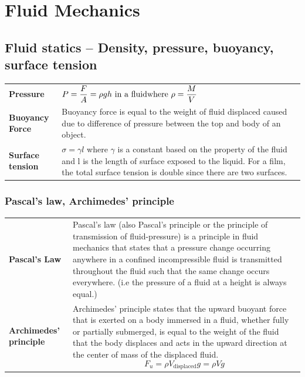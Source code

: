\documentclass[11pt]{article}
\numberwithin{equation}{section}
\begin{document}
	\section{Fluid Mechanics}
		\subsection{Fluid statics {\small \normalfont -- Density, pressure, buoyancy, surface tension}}
			\begin{center}
				\renewcommand{\arraystretch}{2}
				\begin{tabular}[h]{@{}l@{\hspace{2em}}p{10cm}@{}}
					\toprule
					\textbf{Pressure} & $\displaystyle P=\frac{F}{A} = \rho g h \text{~in a fluid} \hfill \text{where~} \rho=\frac{M}{V} \hfill$\\[0.7em]
					\textbf{Buoyancy Force} & Buoyancy force is equal to the weight of fluid displaced caused due to difference of pressure between the top and body of an object. \\
					\textbf{Surface tension} & $\sigma = \gamma l$ where $\gamma$ is a constant based on the property of the fluid and l is the length of surface exposed to the liquid. For a film, the total surface tension is double since there are two surfaces. \\
					\bottomrule
				\end{tabular}
			\end{center}
			\subsubsection{Pascal's law, Archimedes' principle}
				\begin{center}
					\renewcommand{\arraystretch}{2}
					\begin{tabular}[h]{@{}l@{\hspace{2em}}p{10cm}@{}}
						\toprule
						\textbf{Pascal's Law} & Pascal's law (also Pascal's principle or the principle of transmission of fluid-pressure) is a principle in fluid mechanics that states that a pressure change occurring anywhere in a confined incompressible fluid is transmitted throughout the fluid such that the same change occurs everywhere. (i.e the pressure of a fluid at a height is always equal.) \\
						\textbf{Archimedes' principle} & Archimedes' principle states that the upward buoyant force that is exerted on a body immersed in a fluid, whether fully or partially submerged, is equal to the weight of the fluid that the body displaces and acts in the upward direction at the center of mass of the displaced fluid. $$F_u = \rho V_{\text{displaced}} g = \rho V\!g$$ \vspace{-1em}\\
						\bottomrule
					\end{tabular}
				\end{center}
		\pagebreak
\end{document}
